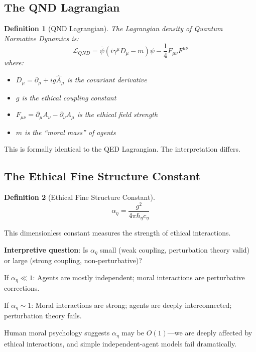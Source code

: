 \documentclass[12pt]{article}
\newtheorem{definition}{Definition}[section]
\begin{document}
\subsection{The QND Lagrangian}

\begin{definition}[QND Lagrangian]
The Lagrangian density of Quantum Normative Dynamics is:
\begin{equation}
    \mathcal{L}_{QND} = \bar{\psi}(i\gamma^\mu D_\mu - m)\psi - \frac{1}{4} F_{\mu\nu} F^{\mu\nu}
\end{equation}
where:
\begin{itemize}
    \item $D_\mu = \partial_\mu + ig\hat{A}_\mu$ is the covariant derivative
    \item $g$ is the ethical coupling constant
    \item $F_{\mu\nu} = \partial_\mu A_\nu - \partial_\nu A_\mu$ is the ethical field strength
    \item $m$ is the ``moral mass'' of agents
\end{itemize}
\end{definition}

This is formally identical to the QED Lagrangian. The interpretation differs.

\subsection{The Ethical Fine Structure Constant}

\begin{definition}[Ethical Fine Structure Constant]
\begin{equation}
    \alpha_\eta = \frac{g^2}{4\pi\hbar_\eta c_\eta}
\end{equation}
\end{definition}

This dimensionless constant measures the strength of ethical interactions.

\textbf{Interpretive question}: Is $\alpha_\eta$ small (weak coupling, perturbation theory valid) or large (strong coupling, non-perturbative)?

If $\alpha_\eta \ll 1$: Agents are mostly independent; moral interactions are perturbative corrections.

If $\alpha_\eta \sim 1$: Moral interactions are strong; agents are deeply interconnected; perturbation theory fails.

Human moral psychology suggests $\alpha_\eta$ may be $O(1)$---we are deeply affected by ethical interactions, and simple independent-agent models fail dramatically.
\end{document}
